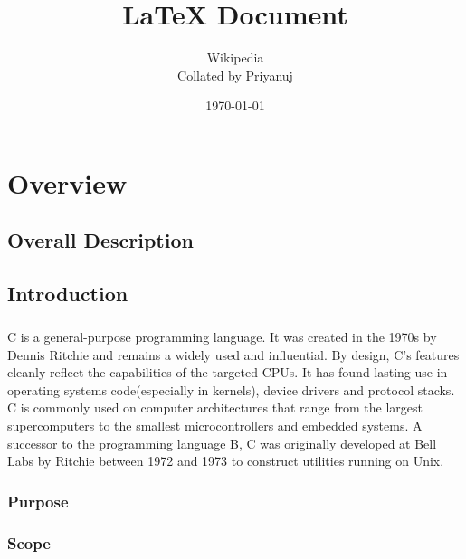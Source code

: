\documentclass{book}
\title{LaTeX Document}
\author{Wikipedia \\ Collated by Priyanuj}
\date{\today}
\begin{document}
	\maketitle
	\tableofcontents
	
	\chapter{Overview}
	
	\section{Overall Description}
	
	\section{Introduction}
	\paragraph{}
	C is a general-purpose programming language. It was created in the 1970s by Dennis Ritchie and remains a widely used and influential. By design, C's features cleanly reflect the capabilities of the targeted CPUs. It has found lasting use in operating systems code(especially in kernels), device drivers and protocol stacks. C is commonly used on computer architectures that range from the largest supercomputers to the smallest microcontrollers and embedded systems. A successor to the programming language B, C was originally developed at Bell Labs by Ritchie between 1972 and 1973 to construct utilities running on Unix.
	
	\subsection{Purpose}
	
	\subsection{Scope}
	
	
\end{document}
